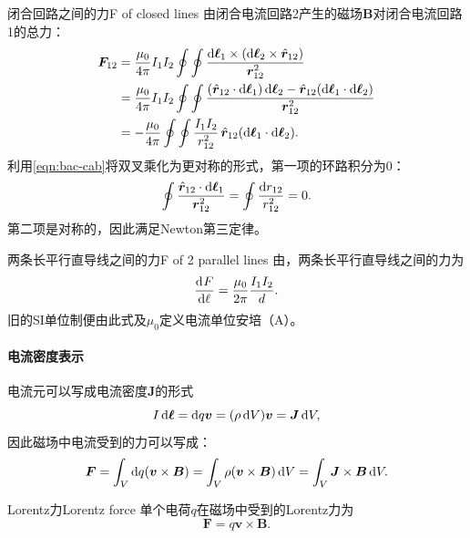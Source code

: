 \begin{example}{闭合回路之间的力}{F of closed lines}
    由闭合电流回路2产生的磁场$\bm B$对闭合电流回路1的总力：
    \begin{align*}
        \bm F_{12} &= \frac{\mu_0}{4\pi}I_1I_2\oint\oint\frac{\d\bm\ell_1 \times (\d\bm\ell_2 \times \uvec r_{12})}{\bm r_{12}^2}\\
        &= \frac{\mu_0}{4\pi}I_1I_2\oint\oint\frac{(\uvec r_{12} \cdot \d\bm\ell_1)\d\bm\ell_2 - \uvec r_{12}(\d\bm\ell_1 \cdot \d\bm\ell_2)}{\bm r_{12}^2}\\
        &= -\frac{\mu_0}{4\pi}\oint\oint\frac{I_1I_2}{r_{12}^2}\uvec r_{12}(\d\bm\ell_1 \cdot \d\bm\ell_2).
    \end{align*}
    利用\eqref{eqn:bac-cab}将双叉乘化为更对称的形式，第一项的环路积分为0：
    \[
        \oint\frac{\mathop{}\!\hat{\bm{r}}_{12} \cdot \mathop{}\!\mathrm{d}\bm\ell_1}{\bm r_{12}^2} = \oint\frac{\mathop{}\!\mathrm{d} r_{12}}{r_{12}^2} = 0.
    \]
    第二项是对称的，因此满足Newton第三定律。
\end{example}
\begin{example}{两条长平行直导线之间的力}{F of 2 parallel lines}
    由，两条长平行直导线之间的力为
    \begin{equation}
        \frac{\mathop{}\!\mathrm{d}^{}F}{\mathrm{d}{\ell}^{}} = \frac{\mu_0}{2\pi}\frac{I_1I_2}d.
    \end{equation}
    旧的SI单位制便由此式及$\mu_0$定义电流单位安培（\unit{A}）。
\end{example}

\paragraph{电流密度表示}

电流元可以写成电流密度$\bm J$的形式
\[
    I\mathop{}\!\mathrm{d}\bm\ell = \mathop{}\!\mathrm{d} q\bm v = (\rho\mathop{}\!\mathrm{d} V)\bm v = \bm J\mathop{}\!\mathrm{d} V,
\]
因此磁场中电流受到的力可以写成：
\[
    \bm F = \int_V\mathop{}\!\mathrm{d} q(\bm v \times \bm B) = \int_V\rho(\bm v \times \bm B)\mathop{}\!\mathrm{d} V = \int_V\bm J \times \bm B\mathop{}\!\mathrm{d} V.
\]
\begin{definition}
    {Lorentz力}{Lorentz force}
    单个电荷$q$在磁场中受到的Lorentz力为
    \begin{equation}
        \bm F = q\bm v \times \bm B.
    \end{equation}
\end{definition}

